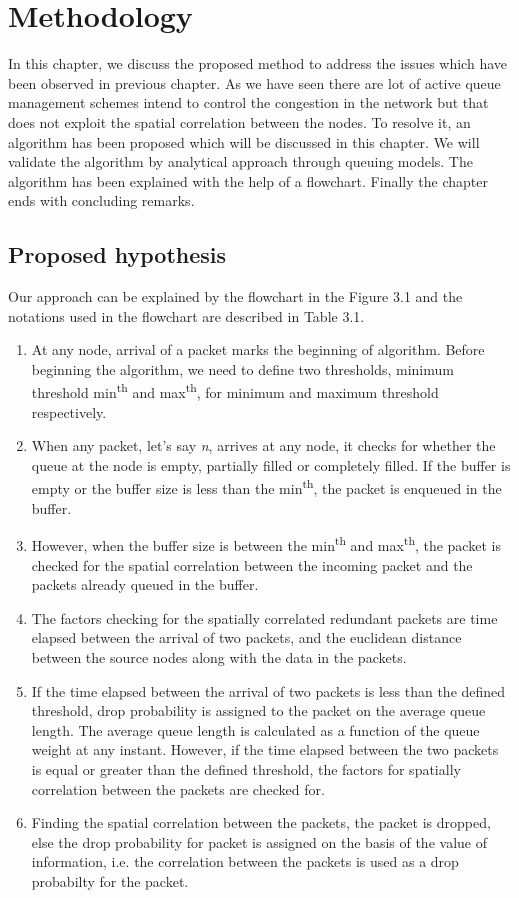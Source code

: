 \chapter{Methodology}
In this chapter, we discuss the proposed method to address the issues which have been observed in previous chapter. As we have seen there are lot of active queue management schemes intend to control the congestion in the network but that does not exploit the spatial correlation between the nodes. To resolve it, an algorithm has been proposed which will be discussed in this chapter. We will validate the algorithm by analytical approach through queuing models. The algorithm has been explained with the help of a flowchart. Finally the chapter ends with concluding remarks. 
\section{Proposed hypothesis}
Our approach can be explained by the flowchart in the Figure 3.1 and the notations used in the flowchart are described in Table 3.1.
\begin{enumerate}
    \item At any node, arrival of a packet marks the beginning of algorithm. Before beginning the algorithm, we need to define two thresholds, minimum threshold min\textsuperscript{th} and max\textsuperscript{th}, for minimum and maximum threshold respectively. 
    \item When any packet, let's say \textit{n}, arrives at any node, it checks for whether the queue at the node is empty, partially filled or completely filled. If the buffer is empty or the buffer size is less than the min\textsuperscript{th}, the packet is enqueued in the buffer.
    \item However, when the buffer size is between the min\textsuperscript{th} and max\textsuperscript{th}, the packet is checked for the spatial correlation between the incoming packet and the packets already queued in the buffer. 
    \item The factors checking for the spatially correlated redundant packets are time elapsed between the arrival of two packets, and the euclidean distance between the source nodes along with the data in the packets.
    \item If the time elapsed between the arrival of two packets is less than the defined threshold, drop probability is assigned to the packet on the average queue length. The average queue length is calculated as a function of the queue weight at any instant. However, if the time elapsed between the two packets is equal or greater than the defined threshold, the factors for spatially correlation between the packets are checked for. 
    \item Finding the spatial correlation between the packets, the packet is dropped, else the drop probability for packet is assigned on the basis of the value of information, i.e. the correlation between the packets is used as a drop probabilty for the packet. 
\end{enumerate}
